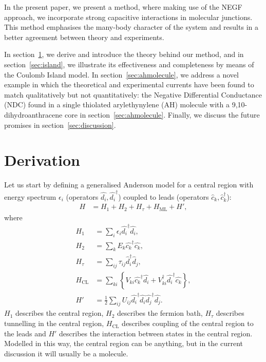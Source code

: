 \documentclass{article}
\begin{document}
\begin{multicols}{2}
        In the present paper, we present a method, where making use of the NEGF approach, we incorporate strong capacitive interactions  in molecular junctions. This method emphasises the many-body character of the system and results in a better agreement between theory and experiments.
        
        In section~\ref{sec:derivation}, we derive and introduce the theory behind our method, and in section~\ref{sec:island}, we illustrate its effectiveness and completeness by means of the Coulomb Island model. In section~\ref{sec:ahmolecule}, we address a novel example in which the theoretical and experimental currents have been found to match qualitatively but not quantitatively: the Negative Differential Conductance (NDC) found in a single thiolated arylethynylene (AH) molecule with a 9,10-dihydroanthracene core in section~\ref{sec:ahmolecule}. Finally, we discuss the future promises in section~\ref{sec:discussion}.

    
    \section{Derivation}\label{sec:derivation}
        Let us start by defining a generalised Anderson model for a central region with energy spectrum $\epsilon_i$ (operators $\hat{d_i}, \hat{d_i}^\dagger$) coupled to leads (operators $\hat{c}_k, \hat{c}_k^\dagger$):
        \begin{align}
            H &= H_1 + H_2 + H_\tau + H_\text{ML} + H', \label{eq:hamiltonian}
        \end{align}
        where
        \begin{align*}
        H_1 &= \sum_i \epsilon_i \hat{d_i}^\dagger \hat{d_i}, \\
        H_2 &= \sum_k E_k \hat{c_k}^\dagger \hat{c_k}, \\
        H_\tau &= \sum_{ij} \tau_{ij} \hat{d}_i^\dagger \hat{d}_j, \\
        H_\text{CL} &= \sum_{ki}\left\{ V_{ki} \hat{c_k}^\dagger \hat{d_i} +  V_{ki}^\dagger \hat{d_i}^\dagger \hat{c_k} \right\},\\
        H' &= \frac{1}{2} \sum_{ij} U_{ij} \hat{d_i}^\dagger \hat{d_i}\hat{d_j}^\dagger \hat{d_j}.
        \end{align*}
        $H_1$ describes the central region, $H_2$ describes the fermion bath, $H_\tau$ describes tunnelling in the central region, $H_\text{CL}$ describes coupling of the central region to the leads and $H'$ describes the interaction between states in the central region. Modelled in this way, the central region can be anything, but in the current discussion it will usually be a molecule.
    

\end{multicols}
\end{document}
